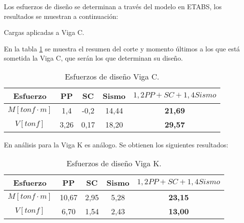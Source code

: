         Los esfuerzos de diseño se determinan a través del modelo en ETABS, los resultados se muestran a continuación:
        
        
        \begin{images}[\label{imagenmultiple}]{Cargas aplicadas a Viga C.}
        \end{images}
        
        En la tabla \ref{esfuerzos-viga-C} se muestra el resumen del corte y momento últimos a los que está sometida la Viga C, que serán los que determinan su diseño.
        
        \begin{table}[H]
          \centering
          \caption{Esfuerzos de diseño Viga C.}
            \begin{tabular}{ccccc}
            \hline
            \textbf{Esfuerzo} & \textbf{PP} & \textbf{SC} & \textbf{Sismo} & \boldmath{}\textbf{$1,2  PP + SC+1,4  Sismo$}\unboldmath{} \bigstrut\\
            \hline
            $M [tonf \cdot m] $ & 1,4   & -0,2  & 14,44 & \textbf{21,69} \bigstrut[t]\\
            $V [tonf]$ & 3,26  & 0,17 & 18,20 & \textbf{29,57} \bigstrut[b]\\
            \hline
            \end{tabular}%
          \label{esfuerzos-viga-C}%
        \end{table}%
        
        En análisis para la Viga K es análogo. Se obtienen los siguientes resultados:
        
        \begin{table}[H]
          \centering
          \caption{Esfuerzos de diseño Viga K.}
            \begin{tabular}{ccccc}
            \hline
            \textbf{Esfuerzo} & \textbf{PP} & \textbf{SC} & \textbf{Sismo} & \boldmath{}\textbf{$1,2  PP +  SC+1,4  Sismo$}\unboldmath{} \bigstrut\\
            \hline
            $M [tonf \cdot m] $ & 10,67 & 2,95 & 5,28  & \textbf{23,15} \bigstrut[t]\\
            $V [tonf]$ & 6,70 & 1,54 & 2,43  & \textbf{13,00} \bigstrut[b]\\
            \hline
            \end{tabular}%
          \label{esfuerzos-viga-K}%
        \end{table}%
    
